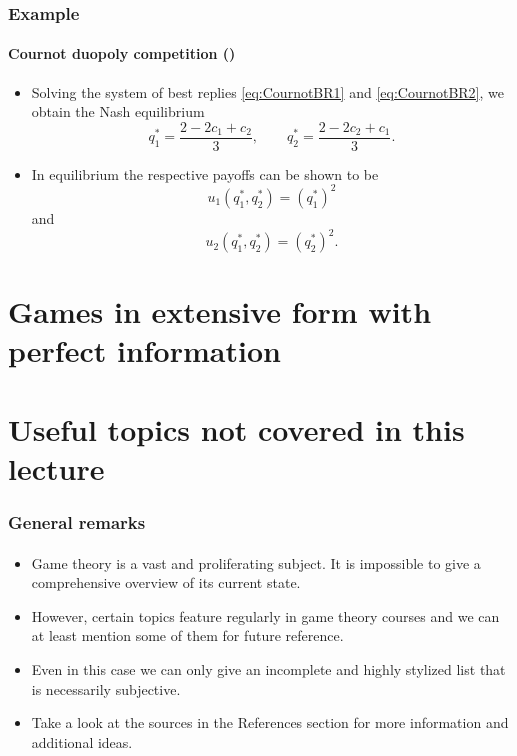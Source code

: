 \documentclass[10pt]{beamer}
\theoremstyle{definition}
\begin{document}
\begin{frame}[fragile]
\frametitle{Example }
\framesubtitle{Cournot duopoly competition ()}
\begin{itemize}\itemsep1em
\item Solving the system of best replies \eqref{eq:CournotBR1} and \eqref{eq:CournotBR2}, we obtain the Nash equilibrium \[ q^*_1 = \dfrac{2-2c_1+c_2}{3},\qquad q^*_2 = \dfrac{2-2c_2+c_1}{3}. \]
\item In equilibrium the respective payoffs can be shown to be \[ u_1(q_1^*,q_2^*) = (q_1^*)^2 \] and \[ u_2(q_1^*,q_2^*) = (q_2^*)^2 .\]
\end{itemize}
\end{frame}



\section{Games in extensive form with perfect information}


\section{Useful topics not covered in this lecture}

\begin{frame}[fragile]
\frametitle{General remarks}
\framesubtitle{}
\begin{itemize}\itemsep1em
\item Game theory is a vast and proliferating subject. It is impossible to give a comprehensive overview of its current state.
\item However, certain topics feature regularly in game theory courses and we can at least mention some of them for future reference.
\item Even in this case we can only give an incomplete and highly stylized list that is necessarily subjective.
\item Take a look at the sources in the References section for more information and additional ideas.
\end{itemize}
\end{frame}
\end{document}
